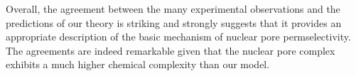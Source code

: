 \documentclass[12pt, a4paper]{article}
\begin{document}
Overall, the agreement between the many experimental observations and the predictions of our theory is striking and strongly suggests that it provides an appropriate description of the basic mechanism of nuclear pore permselectivity.
The agreements are indeed remarkable given that the nuclear pore complex exhibits a much higher chemical complexity than our model.



\printbibliography
\end{document}
